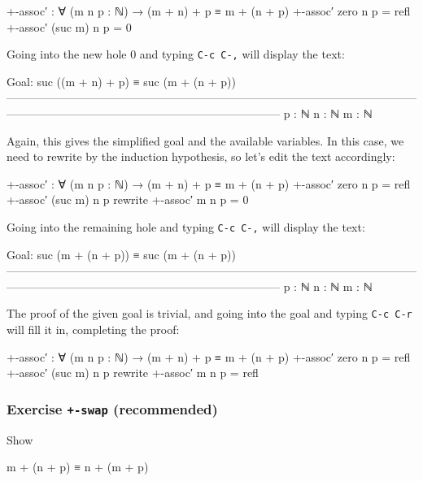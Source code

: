\begin{myDisplay}
+-assoc′ : ∀ (m n p : ℕ) → (m + n) + p ≡ m + (n + p)
+-assoc′ zero n p = refl
+-assoc′ (suc m) n p = { }0
\end{myDisplay}

Going into the new hole 0 and typing \texttt{C-c\ C-,} will display the
text:

\begin{myDisplay}
Goal: suc ((m + n) + p) ≡ suc (m + (n + p))
————————————————————————————————————————————————————————————
p : ℕ
n : ℕ
m : ℕ
\end{myDisplay}

Again, this gives the simplified goal and the available variables. In
this case, we need to rewrite by the induction hypothesis, so let's edit
the text accordingly:

\begin{myDisplay}
+-assoc′ : ∀ (m n p : ℕ) → (m + n) + p ≡ m + (n + p)
+-assoc′ zero n p = refl
+-assoc′ (suc m) n p rewrite +-assoc′ m n p = { }0
\end{myDisplay}

Going into the remaining hole and typing \texttt{C-c\ C-,} will display
the text:

\begin{myDisplay}
Goal: suc (m + (n + p)) ≡ suc (m + (n + p))
————————————————————————————————————————————————————————————
p : ℕ
n : ℕ
m : ℕ
\end{myDisplay}

The proof of the given goal is trivial, and going into the goal and
typing \texttt{C-c\ C-r} will fill it in, completing the proof:

\begin{myDisplay}
+-assoc′ : ∀ (m n p : ℕ) → (m + n) + p ≡ m + (n + p)
+-assoc′ zero n p = refl
+-assoc′ (suc m) n p rewrite +-assoc′ m n p = refl
\end{myDisplay}

\hypertarget{Induction-plus-swap}{%
\subsubsection{\texorpdfstring{Exercise \texttt{+-swap}
(recommended)}{Exercise +-swap (recommended)}}\label{Induction-plus-swap}}

Show

\begin{myDisplay}
m + (n + p) ≡ n + (m + p)
\end{myDisplay}

